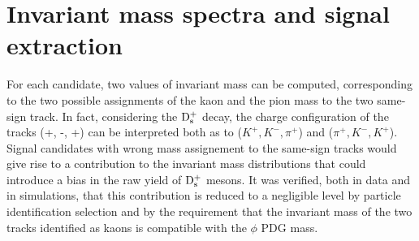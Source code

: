 \section{Invariant mass spectra and signal extraction}
\label{sec:invMassPlotsPP}
For each candidate, two values of invariant mass can be computed, 
corresponding to the two possible assignments of the kaon and the 
pion mass to the two same-sign track. In fact, considering the ${\rm D_s^+}$
 decay, the charge configuration of the tracks (+, -, +) can be interpreted
  both as to ($K^+,K^-,\pi^+$) and ($\pi^+,K^-,K^+$). Signal candidates with 
  wrong mass assignement to the same-sign tracks would give rise to 
  a contribution to the invariant mass distributions that could introduce
   a bias in the raw yield of ${\rm D_s^+}$ mesons. It was verified, both in 
   data and in simulations, that this contribution is reduced to a negligible 
   level by particle identification selection and by the requirement that the
    invariant mass of the two tracks identified as kaons is compatible with 
    the $\phi$ PDG mass.


